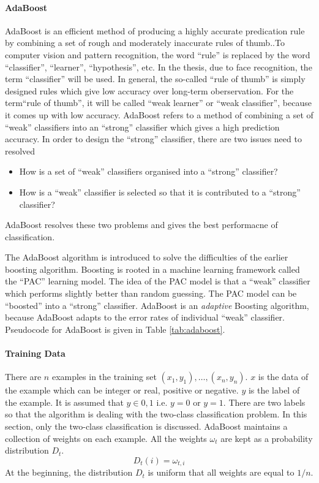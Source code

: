 \paragraph{AdaBoost}
AdaBoost is an efficient method of producing a highly accurate predication rule by combining a set of rough and moderately inaccurate rules of thumb..To computer vision and pattern recognition, the word ``rule'' is replaced by the word ``classifier'', ``learner'', ``hypothesis'', etc. In the thesis, due to face recognition, the term ``classifier'' will be used.  In general, the so-called ``rule of thumb'' is simply designed rules which give low accuracy over long-term oberservation. For the term``rule of thumb'', it will be called ``weak learner'' or ``weak classifier'', because it comes up with low accuracy. AdaBoost refers to a method of combining a set of ``weak'' classifiers into an ``strong'' classifier which gives a high prediction accuracy. In order to design the ``strong'' classifier, there are two issues need to resolved
\begin{itemize}
 \item How is a set of ``weak'' classifiers organised into a ``strong'' classifier?
 \item How is a ``weak'' classifier is selected so that it is contributed to a ``strong'' classifier?
\end{itemize}
AdaBoost resolves these two problems and gives the best performacne of classification.

The AdaBoost algorithm is introduced to solve the difficulties of the earlier boosting algorithm. Boosting is rooted in a machine learning framework called the ``PAC'' learning model. The idea of the PAC model is that a ``weak'' classifier which performs slightly better than random guessing. The PAC model can be ``boosted'' into a ``strong'' classifier. AdaBoost is an \textit{adaptive} Boosting algorithm, because AdaBoost adapts to the error rates of individual ``weak'' classifier. Pseudocode for AdaBoost is given in \mbox{Table} \ref{tab:adaboost}. 

\paragraph{Training Data}There are $n$ examples in the training set $(x_{1},y_{1}),\ldots,(x_{n},y_{n})$. $x$ is the data of the example which can be integer or real, positive or negative. $y$ is the label of the example. It is assumed that $y \in {0,1}$ i.e. $y = 0$ or $y = 1$. There are two labels so that the algorithm is dealing with the two-class classification problem. In this section, only the two-class classification is discussed. AdaBoost maintains a collection of weights on each example. All the weights $\omega_{t}$ are kept as a probability distribution $D_{t}$.
\begin{equation}\label{eq:distribution}
 D_{t}(i) = \omega_{t,i}
\end{equation}
At the beginning, the distribution $D_{t}$ is uniform that all weights are equal to $1/n$. 

